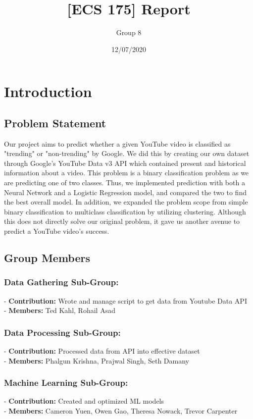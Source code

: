 \documentclass{article}
\title{[ECS 175] Report}
\date{12/07/2020}
\author{Group 8}
\begin{document}
\maketitle

\section*{Introduction}
\subsection*{Problem Statement}
\quad Our project aims to predict whether a given YouTube video is classified as "trending" or "non-trending" by Google. We did this by creating our own dataset through Google's YouTube Data v3 API which contained present and historical information about a video. This problem is a binary classification problem as we are predicting one of two classes. Thus, we implemented prediction with both a Neural Network and a Logistic Regression model, and compared the two to find the best overall model. In addition, we expanded the problem scope from simple binary classification to multiclass classification by utilizing clustering. Although this does not directly solve our original problem, it gave us another avenue to predict a YouTube video's success.

\subsection*{Group Members}
\subsubsection*{Data Gathering Sub-Group:}
- \textbf{Contribution:} Wrote and manage script to get data from Youtube Data API \\
- \textbf{Members:} Ted Kahl, Rohail Asad
\subsubsection*{Data Processing Sub-Group:}
- \textbf{Contribution:} Processed data from API into effective dataset \\
- \textbf{Members:} Phalgun Krishna, Prajwal Singh, Seth Damany
\subsubsection*{Machine Learning Sub-Group:}
- \textbf{Contribution:} Created and optimized ML models \\
- \textbf{Members:} Cameron Yuen, Owen Gao, Theresa Nowack, Trevor Carpenter
\end{document}
